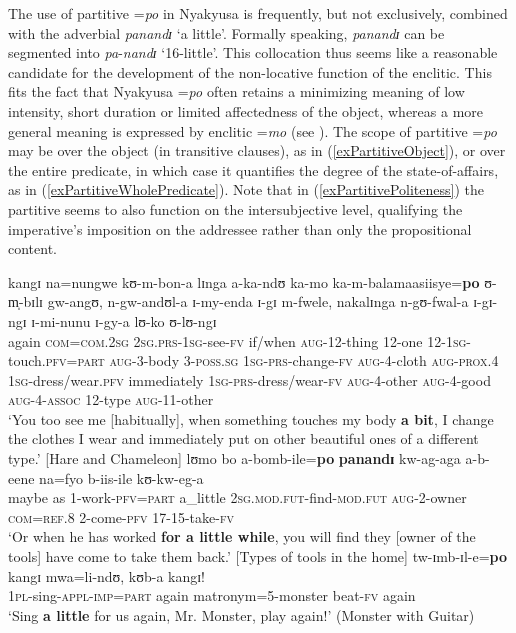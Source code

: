 The use of partitive \mbox{=\textit{po}} in Nyakyusa is frequently, but not exclusively, combined with the adverbial \textit{panandɪ} \lq a little'. Formally speaking, \textit{panandɪ} can be segmented into \textit{pa}-\textit{nandɪ} \lq 16-little'. This collocation thus seems like a reasonable candidate for the development of the non-locative function of the enclitic. This fits the fact that Nyakyusa \mbox{=\textit{po}} often retains a minimizing meaning of low intensity, short duration or limited affectedness of the object, whereas a more general  meaning is expressed by enclitic \mbox{=\textit{mo}} (see ). The scope of partitive \mbox{=\textit{po}} may be over the object (in transitive clauses), as in (\ref{exPartitiveObject}), or over the entire predicate, in which case it quantifies the degree of the state-of-affairs, as in (\ref{exPartitiveWholePredicate}). Note that in (\ref{exPartitivePoliteness}) the partitive seems to also function on the intersubjective level, qualifying the imperative's imposition on the addressee rather than only the propositional content.
\begin{exe}
	\ex \label{exPartitiveObject} \gll kangɪ na=nungwe kʊ-m-bon-a lɪnga a-ka-ndʊ ka-mo ka-m-balamaasiisye=\textbf{po} ʊ-m̩-bɪlɪ gw-angʊ, n-gw-andʊl-a ɪ-my-enda ɪ-gɪ m-fwele, nakalɪnga n-gʊ-fwal-a ɪ-gɪ-ngɪ ɪ-mi-nunu ɪ-gy-a lʊ-ko ʊ-lʊ-ngɪ\\
	again \textsc{com}=\textsc{com.2sg} \textsc{2sg.prs}-\textsc{1sg}-see-\textsc{fv} if/when \textsc{aug}-12-thing 12-one 12-\textsc{1sg}-touch.\textsc{pfv}=\textsc{part} \textsc{aug}-3-body 3-\textsc{poss.sg} \textsc{1sg}-\textsc{prs}-change-\textsc{fv} \textsc{aug}-4-cloth \textsc{aug}-\textsc{prox.4} \textsc{1sg}-dress/wear.\textsc{pfv} immediately \textsc{1sg}-\textsc{prs}-dress/wear-\textsc{fv} \textsc{aug}-4-other \textsc{aug}-4-good \textsc{aug}-4-\textsc{assoc} 12-type \textsc{aug}-11-other\\
	\glt `You too see me [habitually], when something touches my body \textbf{a bit}, I change the clothes I wear and immediately put on other beautiful ones of a different type.' [Hare and Chameleon]
	\ex \label{exPartitiveWholePredicate} \gll lʊmo bo a-bomb-ile=\textbf{po} \textbf{panandɪ} kw-ag-aga a-b-eene na=fyo b-iis-ile kʊ-kw-eg-a\\
	maybe as 1-work-\textsc{pfv}=\textsc{part} a\_little \textsc{2sg.mod.fut}-find-\textsc{mod.fut} \textsc{aug}-2-owner \textsc{com}=\textsc{ref.8} 2-come-\textsc{pfv} 17-15-take-\textsc{fv}\\
	\glt \lq Or when he has worked \textbf{for a little while}, you will find they [owner of the tools] have come to take them back.' [Types of tools in the home]%
	\ex \label{exPartitivePoliteness} \gll tw-ɪmb-ɪl-e=\textbf{po} kangɪ mwa=li-ndʊ, kʊb-a kangɪ!\\
	\textsc{1pl}-sing-\textsc{appl}-\textsc{imp}=\textsc{part} again matronym=5-monster beat-\textsc{fv} again\\
	\glt \lq Sing \textbf{a little} for us again, Mr. Monster, play again!' (Monster with Guitar)
\end{exe}

